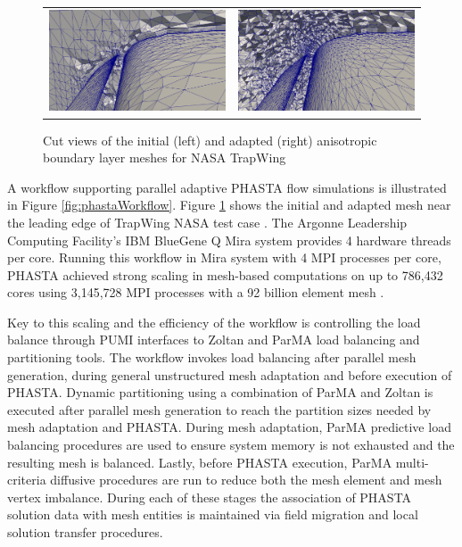 \begin{figure}
\centering
\begin{tabular}{cc}
\includegraphics[width=2.5in]{TrapWing_Cut_LeadingEdge_Init.png}&
\includegraphics[width=2.5in]{TrapWing_Cut_LeadingEdge_Adapt2.png}
\end{tabular}
\caption{Cut views of the initial (left) and adapted (right) anisotropic
boundary layer meshes for NASA TrapWing~\cite{chitale-aiaa14}}
\label{fig:phasta-mesh}  %
\end{figure}

A workflow supporting parallel adaptive PHASTA flow simulations is illustrated in
Figure \ref{fig:phastaWorkflow}.
Figure \ref{fig:phasta-mesh} shows the initial
and adapted mesh near the leading edge of TrapWing NASA test
case \cite{chitale-aiaa14}.
The Argonne Leadership Computing Facility's IBM
BlueGene Q Mira system provides 4 hardware threads per core.
Running this workflow in Mira system with 4 MPI processes per core,
PHASTA achieved strong scaling
in mesh-based computations on up to 786,432 cores using 3,145,728 MPI processes
with a 92 billion element mesh \cite{rasquinCise2014}.

Key to this scaling and the efficiency of the workflow is controlling the load
balance through PUMI interfaces to Zoltan and ParMA load balancing and
partitioning tools. The workflow invokes load balancing after parallel mesh
generation, during general unstructured mesh adaptation and before execution of
PHASTA. Dynamic partitioning using a combination of ParMA and Zoltan is executed
after parallel mesh generation to reach the partition sizes needed by mesh
adaptation and PHASTA.  During mesh adaptation, ParMA predictive load balancing
procedures are used to ensure system memory is not exhausted and the resulting
mesh is balanced.  Lastly, before PHASTA execution, ParMA multi-criteria
diffusive procedures are run to reduce both the mesh element and mesh vertex
imbalance.  During each of these stages the association of PHASTA solution data
with mesh entities is maintained via field migration and local solution
transfer procedures.

